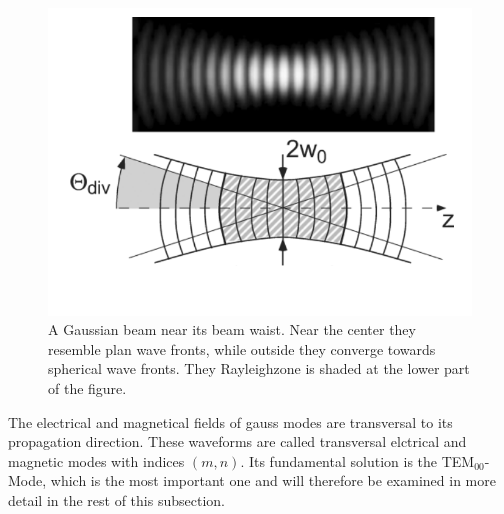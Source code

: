 \begin{figure}[H]
	\centering
	\includegraphics[width=0.8\linewidth]{figures/fabry-perot/gaussian-mode-near-beam-waist}
	\caption[A Gaussian beam near its beam waist.]
	{A Gaussian beam near its beam waist.
		Near the center they resemble plan wave fronts, while outside they converge towards spherical wave fronts.
		They Rayleighzone is shaded at the lower part of the figure.\cite{meschede_optik_2008}}
	\label{fig:gaussian-mode-near-beam-waist}
\end{figure}

The electrical and magnetical fields of gauss modes are transversal to its propagation direction.
These waveforms are called transversal elctrical and magnetic modes with indices $(m,n)$.
Its fundamental solution is the TEM$_{00}$-Mode, which is the most important one and will therefore be examined in more detail in the rest of this subsection.

